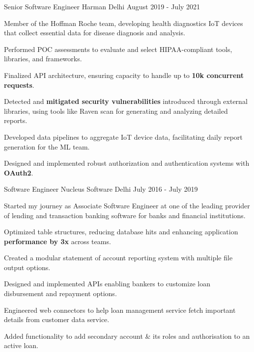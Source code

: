 \begin{cventries}
  \cventry
    {Senior Software Engineer} %
    {Harman} %
    {Delhi} %
    {August 2019 - July 2021} %
    {
      \begin{cvitems} %
        \item {Member of the Hoffman Roche team, developing health diagnostics IoT devices that collect essential data for disease diagnosis and analysis.}
        \item {Performed POC assessments to evaluate and select HIPAA-compliant tools, libraries, and frameworks.}
        \item {Finalized API architecture, ensuring capacity to handle up to \textbf{10k concurrent requests}.}
        \item {Detected and \textbf{mitigated security vulnerabilities} introduced through external libraries, using tools like Raven scan for generating and analyzing detailed reports.}
        \item {Developed data pipelines to aggregate IoT device data, facilitating daily report generation for the ML team.}
        \item {Designed and implemented robust authorization and authentication systems with \textbf{OAuth2}.}
      \end{cvitems}
    }

  \cventry
    {Software Engineer} %
    {Nucleus Software} %
    {Delhi} %
    {July 2016 - July 2019} %
    {
      \begin{cvitems} %
        \item {Started my journey as Associate Software Engineer at one of the leading provider of lending and transaction banking software for banks and financial institutions.}
        \item {Optimized table structures, reducing database hits and enhancing application \textbf{performance by 3x} across teams.}
        \item {Created a modular statement of account reporting system with multiple file output options.}
        \item {Designed and implemented APIs enabling bankers to customize loan disbursement and repayment options.}
        \item {Engineered web connectors to help loan management service fetch important details from customer data service.}
        \item {Added functionality to add secondary account \& its roles and authorisation to an active loan.}
      \end{cvitems}
    }

\end{cventries}